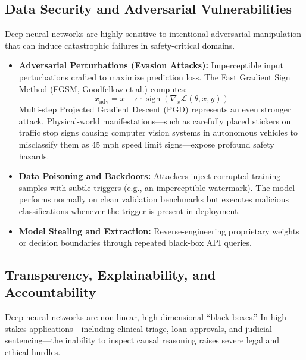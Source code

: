 \documentclass[12pt,a4paper]{article}
\begin{document}
\subsection{Data Security and Adversarial Vulnerabilities}
Deep neural networks are highly sensitive to intentional adversarial manipulation that can induce catastrophic failures in safety-critical domains.

\begin{itemize}[leftmargin=*]
    \item \textbf{Adversarial Perturbations (Evasion Attacks):} Imperceptible input perturbations crafted to maximize prediction loss. The Fast Gradient Sign Method (FGSM, Goodfellow et al.) computes:
    \[
    x_{\text{adv}} = x + \epsilon \cdot \operatorname{sign}\left(\nabla_x \mathcal{L}(\theta, x, y)\right)
    \]
    Multi-step Projected Gradient Descent (PGD) represents an even stronger attack. Physical-world manifestations—such as carefully placed stickers on traffic stop signs causing computer vision systems in autonomous vehicles to misclassify them as 45 mph speed limit signs—expose profound safety hazards.
    \item \textbf{Data Poisoning and Backdoors:} Attackers inject corrupted training samples with subtle triggers (e.g., an imperceptible watermark). The model performs normally on clean validation benchmarks but executes malicious classifications whenever the trigger is present in deployment.
    \item \textbf{Model Stealing and Extraction:} Reverse-engineering proprietary weights or decision boundaries through repeated black-box API queries.
\end{itemize}

\subsection{Transparency, Explainability, and Accountability}
Deep neural networks are non-linear, high-dimensional ``black boxes.'' In high-stakes applications—including clinical triage, loan approvals, and judicial sentencing—the inability to inspect causal reasoning raises severe legal and ethical hurdles.
\end{document}
